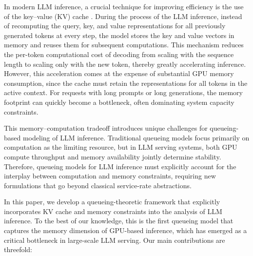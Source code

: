 \documentclass{article}
\theoremstyle{plain}
\theoremstyle{definition}
\theoremstyle{remark}
\begin{document}
In modern LLM inference, a crucial technique for improving efficiency is the use of the key–value (KV) cache \citep{pope2023efficiently,kwon2023efficient}. During the process of the LLM inference, instead of recomputing the query, key, and value representations for all previously generated tokens at every step, the model stores the key and value vectors in memory and reuses them for subsequent computations. This mechanism reduces the per-token computational cost of decoding from scaling with the sequence length to scaling only with the new token, thereby greatly accelerating inference. However, this acceleration comes at the expense of substantial GPU memory consumption, since the cache must retain the representations for all tokens in the active context. For requests with long prompts or long generations, the memory footprint can quickly become a bottleneck, often dominating system capacity constraints.

This memory–computation tradeoff introduces unique challenges for queueing-based modeling of LLM inference. Traditional queueing models focus primarily on computation as the limiting resource, but in LLM serving systems, both GPU compute throughput and memory availability jointly determine stability. Therefore, queueing models for LLM inference must explicitly account for the interplay between computation and memory constraints, requiring new formulations that go beyond classical service-rate abstractions.

In this paper, we develop a queueing-theoretic framework that explicitly incorporates KV cache and memory constraints into the analysis of LLM inference. To the best of our knowledge, this is the first queueing model that captures the memory dimension of GPU-based inference, which has emerged as a critical bottleneck in large-scale LLM serving. Our main contributions are threefold:
\end{document}

